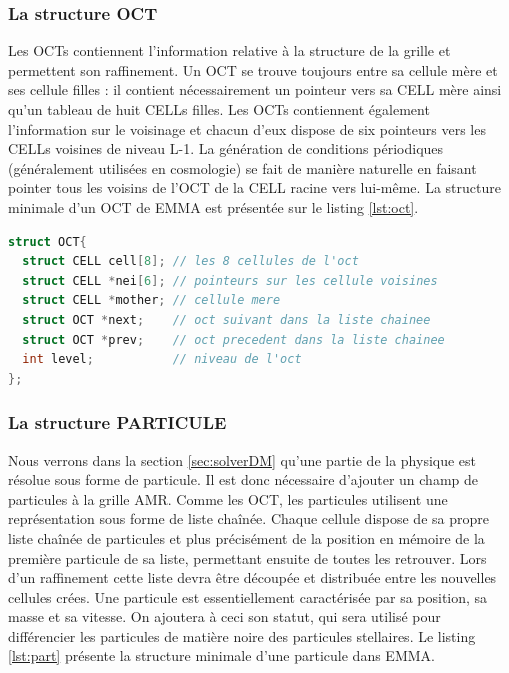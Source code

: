 \subsubsection{La structure OCT}
Les OCTs contiennent l'information relative à la structure de la grille et permettent son raffinement.
Un OCT se trouve toujours entre sa cellule mère et ses cellule filles : il contient nécessairement un pointeur vers sa CELL mère ainsi qu'un tableau de huit CELLs filles.
Les OCTs contiennent également l'information sur le voisinage et chacun d'eux dispose de six pointeurs vers les CELLs voisines de niveau L-1.
La génération de conditions périodiques (généralement utilisées en cosmologie) se fait de manière naturelle en faisant pointer tous les voisins de l'OCT de la CELL racine vers lui-même.
La structure minimale d'un OCT de EMMA est présentée sur le listing \ref{lst:oct}.
\begin{lstlisting}[float=bth,language=C,frame=tb,caption={La structure OCT de EMMA},label=lst:oct]
struct OCT{
  struct CELL cell[8]; // les 8 cellules de l'oct
  struct CELL *nei[6]; // pointeurs sur les cellule voisines
  struct CELL *mother; // cellule mere
  struct OCT *next;    // oct suivant dans la liste chainee
  struct OCT *prev;    // oct precedent dans la liste chainee
  int level;           // niveau de l'oct
};
\end{lstlisting}


\subsubsection{La structure PARTICULE}
\label{sec:PART}

Nous verrons dans la section \ref{sec:solverDM} qu'une partie de la physique est résolue sous forme de particule.
Il est donc nécessaire d'ajouter un champ de particules à la grille \ac{AMR}.
Comme les OCT, les particules utilisent une représentation sous forme de liste chaînée.
Chaque cellule dispose de sa propre liste chaînée de particules et plus précisément de la position en mémoire de la première particule de sa liste, permettant ensuite de toutes les retrouver.
Lors d'un raffinement cette liste devra être découpée et distribuée entre les nouvelles cellules crées.
Une particule est essentiellement caractérisée par sa position, sa masse et sa vitesse.
On ajoutera à ceci son statut, qui sera utilisé pour différencier les particules de matière noire des particules stellaires. 
Le listing \ref{lst:part} présente la structure minimale d'une particule dans EMMA.


